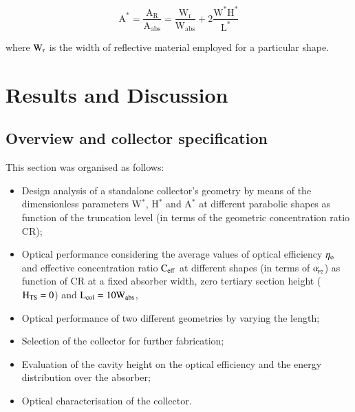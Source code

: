 \vspace{-0.75cm}
\begin{equation}
\mathrm{{A^*} = \frac{{{A_R}}}{{{A_{abs}}}} = \frac{{{W_r}}}{{{W_{abs}}}} + 2\frac{{{W^*}{H^*}}}{{{L^*}}}}
\label{reflectorarea}
\end{equation}

\noindent where $\rm{W_r}$ is the width of reflective material employed for a particular shape.

\section{Results and Discussion}

\subsection{Overview and collector specification}

This section was organised as follows:

\begin{itemize}[topsep=5pt,partopsep=0pt] \itemsep0pt
\item Design analysis of a standalone collector's geometry by means of the dimensionless parameters W$^{*}$, H$^{*}$ and A$^{*}$ at different parabolic shapes as function of the truncation level (in terms of the geometric concentration ratio CR);
\item Optical performance considering the average values of optical efficiency $\rm{\eta_o}$ and effective concentration ratio $\rm{C_{eff}}$ at different shapes (in terms of $\alpha_{\!_{\rm{P2}}}$) as function of CR at a fixed absorber width, zero tertiary section height ($\rm{H_{TS} = 0}$) and $\rm{L_{col} = 10W_{abs}}$, 
\item Optical performance of two different geometries by varying the length;
\item Selection of the collector for further fabrication;
\item Evaluation of the cavity height on the optical efficiency and the energy distribution over the absorber;
\item Optical characterisation of the collector.
\end{itemize}


